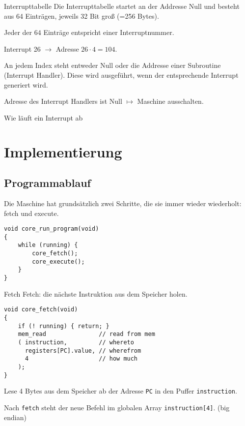 \begin{frame}{Interrupttabelle}
 Die Interrupttabelle startet an der Addresse Null und besteht aus 64 Einträgen,
 jeweils 32 Bit groß (=256 Bytes).
 
 Jeder der $64$ Einträge entspricht einer Interruptnummer.
 
 Interrupt 26 $\to$ Adresse $26 \cdot 4 = 104$.
 
 An jedem Index steht entweder Null oder die Addresse einer Subroutine
 (Interrupt Handler). Diese wird ausgeführt, wenn der entsprechende Interrupt
 generiert wird.
 
 Adresse des Interrupt Handlers ist Null $\mapsto$ Maschine ausschalten.
\end{frame}



\begin{frame}{Wie läuft ein Interrupt ab}
 \begin{center}
  
 \end{center}
\end{frame}



\section{Implementierung}

\subsection{Programmablauf}

\begin{frame}[fragile]{\insertsubsection}
 Die Maschine hat grundsätzlich zwei Schritte, die sie immer wieder wiederholt: 
 fetch und execute. 
 \begin{lstlisting}
void core_run_program(void)
{
    while (running) {
        core_fetch();
        core_execute();
    }
}
 \end{lstlisting}
\end{frame}


\begin{frame}[fragile]{Fetch}
 Fetch: die nächste Instruktion aus dem Speicher holen.
\begin{lstlisting}
void core_fetch(void)
{
    if (! running) { return; }
    mem_read               // read from mem
    ( instruction,         // whereto
      registers[PC].value, // wherefrom
      4                    // how much
    );
}
\end{lstlisting}
Lese 4 Bytes aus dem Speicher ab der Adresse \texttt{PC} in den
Puffer \texttt{instruction}.

Nach \texttt{fetch} steht der neue Befehl im globalen Array
\texttt{instruction[4]}. (big endian)
\end{frame}



